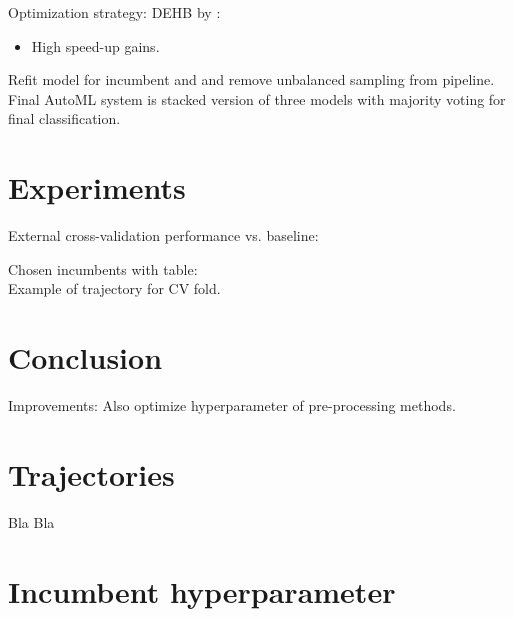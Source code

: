 \documentclass[11pt]{article}
\begin{document}
Optimization strategy: DEHB by \citet{dehb}:
\begin{itemize}
\item High speed-up gains.
\end{itemize}

Refit model for incumbent and and remove unbalanced sampling from pipeline. \\

Final AutoML system is stacked version of three models with majority voting for final classification.


\section{Experiments}

External cross-validation performance vs. baseline:


Chosen incumbents with table: \\


Example of trajectory for CV fold.


\section{Conclusion}

Improvements: Also optimize hyperparameter of pre-processing methods.







\appendix

\section{Trajectories}

Bla Bla

\section{Incumbent hyperparameter}
\end{document}
